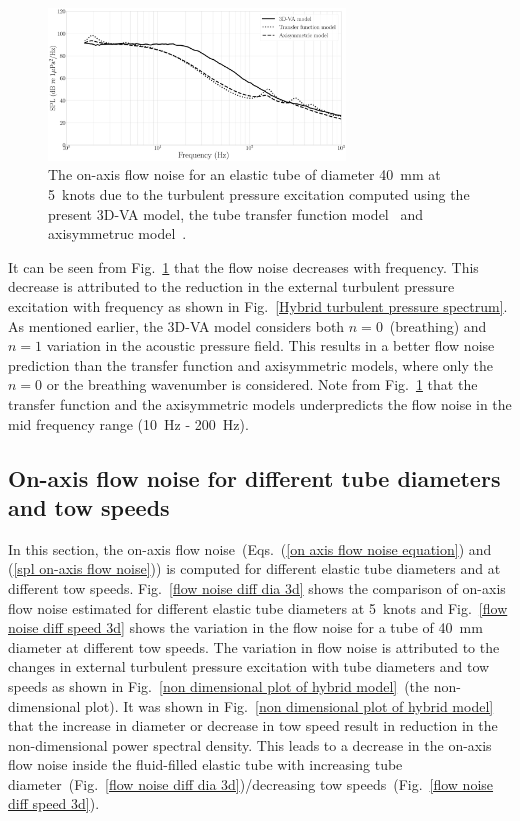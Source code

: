 \documentclass[twocolumn,10pt]{asme2ej}
\begin{document}
\begin{figure}[h]
    \centering
    \includegraphics[width=3.1in]{figure/Flow noise comparison of 3D vs Knight and Jineesh.pdf}
    \caption{The on-axis flow noise for an elastic tube of diameter 40~mm at 5~knots due to the turbulent pressure excitation computed using the present 3D-VA model, the tube transfer function model~\cite{knight1996} and axisymmetruc model~\cite{jineesh2013}.} 
    \label{3d vs knight vs jineesh}
\end{figure}



 It can be seen from Fig.~\ref{3d vs knight vs jineesh} that the flow noise decreases with frequency. This decrease is attributed to the reduction in the external turbulent pressure excitation with frequency as shown in Fig.~\ref{Hybrid turbulent pressure spectrum}. As mentioned earlier, the 3D-VA model considers both $n=0$~(breathing) and $n=1$ variation in the acoustic pressure field. This results in a better flow noise prediction than the transfer function and axisymmetric models, where only the $n=0$ or the breathing wavenumber is considered. Note from Fig.~\ref{3d vs knight vs jineesh} that the transfer function and the axisymmetric models underpredicts the flow noise in the mid frequency range (10~Hz - 200~Hz).


\subsection{On-axis flow noise for different tube diameters and tow speeds}
\label{parametric study}

In this section, the on-axis flow noise~(Eqs.~(\ref{on axis flow noise equation}) and (\ref{spl on-axis flow noise})) is computed for different elastic tube diameters and at different tow speeds. Fig.~\ref{flow noise diff dia 3d} shows the comparison of on-axis flow noise estimated for different elastic tube diameters at 5~knots and  Fig.~\ref{flow noise diff speed 3d} shows the variation in the flow noise for a tube of 40~mm diameter at different tow speeds. The variation in flow noise is attributed to the changes in external turbulent pressure excitation with tube diameters and tow speeds as shown in Fig.~\ref{non dimensional plot of hybrid model}~(the non-dimensional plot). It was shown in Fig.~\ref{non dimensional plot of hybrid model} that the increase in diameter or decrease in tow speed result in reduction in the non-dimensional power spectral density. This leads to a decrease in the on-axis flow noise inside the fluid-filled elastic tube with increasing tube diameter~(Fig.~\ref{flow noise diff dia 3d})/decreasing tow speeds~(Fig.~\ref{flow noise diff speed 3d}).
\end{document}
